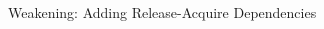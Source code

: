 \documentclass[notes xcolor=dvipsnames]{beamer}
\begin{document}
    \begin{frame}{Weakening: Adding Release-Acquire Dependencies}
        
        \begin{figure}
        \end{figure}

        
        \begin{columns}
            
            \begin{column}{0.5\textwidth}

                \begin{figure}
                \end{figure}
                
            \end{column}

            \begin{column}{0.5\textwidth}
                
                \begin{figure}
                \end{figure}

            \end{column}

        \end{columns}
    
    \end{frame}
\end{document}
